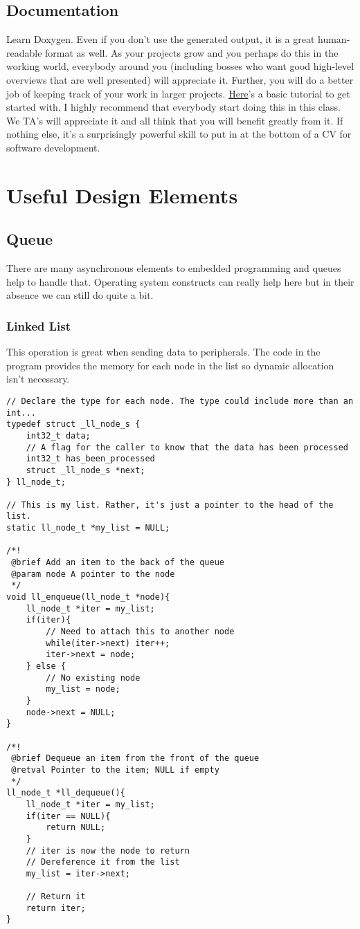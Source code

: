 \documentclass[10pt]{article}
\begin{document}
\subsection{Documentation}

Learn Doxygen. Even if you don't use the generated output, it is a great human-readable format as well. As your projects grow and you perhaps do this in the working world, everybody around you (including bosses who want good high-level overviews that are well presented) will appreciate it. Further, you will do a better job of keeping track of your work in larger projects.
\hyperref{http://www.stack.nl/~dimitri/doxygen/docblocks.html}{}{}{Here}'s a basic tutorial to get started with. I highly recommend that everybody start doing this in this class. We TA’s will appreciate it and all think that you will benefit greatly from it. If nothing else, it's a surprisingly powerful skill to put in at the bottom of a CV for software development.

\section{Useful Design Elements}
\subsection{Queue}
There are many asynchronous elements to embedded programming and queues help to handle that. Operating system constructs can really help here but in their absence we can still do quite a bit.
\subsubsection*{Linked List}
This operation is great when sending data to peripherals. The code in the program provides the memory for each node in the list so dynamic allocation isn't necessary.
\begin{lstlisting}[label=lst-linked-list-queue,caption=Linked list queue]
// Declare the type for each node. The type could include more than an int...
typedef struct _ll_node_s {
	int32_t data;
	// A flag for the caller to know that the data has been processed
	int32_t has_been_processed
	struct _ll_node_s *next;
} ll_node_t;

// This is my list. Rather, it's just a pointer to the head of the list.
static ll_node_t *my_list = NULL;

/*!
 @brief Add an item to the back of the queue
 @param node A pointer to the node
 */
void ll_enqueue(ll_node_t *node){
	ll_node_t *iter = my_list;
	if(iter){
		// Need to attach this to another node
		while(iter->next) iter++;
		iter->next = node;
	} else {
		// No existing node
		my_list = node;
	}
	node->next = NULL;
}

/*!
 @brief Dequeue an item from the front of the queue
 @retval Pointer to the item; NULL if empty
 */
ll_node_t *ll_dequeue(){
	ll_node_t *iter = my_list;
	if(iter == NULL){
		return NULL;
	}
	// iter is now the node to return
	// Dereference it from the list
	my_list = iter->next;
	
	// Return it
	return iter;
}
\end{lstlisting}
\end{document}
